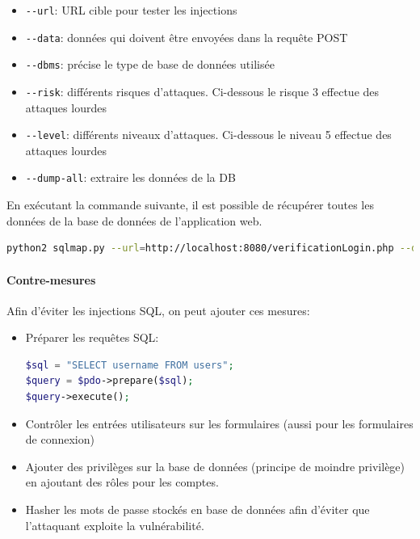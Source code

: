 \documentclass[a4paper,10pt]{article}
\begin{document}
        \begin{onehalfspacing}
        \begin{itemize}
        \item[] \verb|--url|: URL cible pour tester les injections
        \item[] \verb|--data|: données qui doivent être envoyées dans la requête POST
        \item[] \verb|--dbms|:  précise le type de base de données utilisée
        \item[] \verb|--risk|: différents risques d’attaques. Ci-dessous le risque 3 effectue des attaques lourdes
        \item[] \verb|--level|: différents niveaux d’attaques. Ci-dessous le niveau 5 effectue des attaques lourdes
        \item[] \verb|--dump-all|: extraire les données de la DB \\
        \end{itemize}
        \end{onehalfspacing}
        En exécutant la commande suivante, il est possible de récupérer toutes les données de la base de données de l'application web.
        \begin{lstlisting}[language=bash]
python2 sqlmap.py --url=http://localhost:8080/verificationLogin.php --data="inputLogin=111&inputPassword=222" --dbms=SQLite --risk=3 --level=5 --dump-all
\end{lstlisting}
        \paragraph{Contre-mesures}
        Afin d'éviter les injections SQL, on peut ajouter ces mesures:
        \begin{onehalfspacing}
        \begin{itemize}
        \item Préparer les requêtes SQL:
        \begin{lstlisting}[language=php]
$sql = "SELECT username FROM users";
$query = $pdo->prepare($sql);
$query->execute();
\end{lstlisting}
        \item Contrôler les entrées utilisateurs sur les formulaires (aussi pour les formulaires de connexion)
        \item Ajouter des privilèges sur la base de données (principe de moindre privilège) en ajoutant des rôles pour les comptes.
        \item Hasher les mots de passe stockés en base de données afin d'éviter que l'attaquant exploite la vulnérabilité.
        \end{itemize}
        \end{onehalfspacing}
\end{document}
